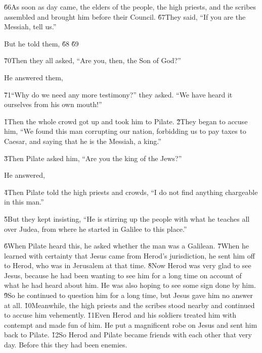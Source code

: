 \v{66}As soon as day came, the elders of the people, the high priests, and the scribes assembled and brought him before their Council. \v{67}They said, ``If you are the Messiah, tell us.''

But he told them,  \v{68} \v{69}

\v{70}Then they all asked, ``Are you, then, the Son of God?''

He answered them, 

\v{71}``Why do we need any more testimony?'' they asked. ``We have heard it ourselves from his own mouth!''

\v{1}Then the whole crowd got up and took him to Pilate. \v{2}They began to accuse him, ``We found this man corrupting our nation, forbidding us to pay taxes to Caesar, and saying that he is the Messiah, a king.''

\v{3}Then Pilate asked him, ``Are you the king of the Jews?''

He answered, 

\v{4}Then Pilate told the high priests and crowds, ``I do not find anything chargeable in this man.''

\v{5}But they kept insisting, ``He is stirring up the people with what he teaches all over Judea, from where he started in Galilee to this place.''

\v{6}When Pilate heard this, he asked whether the man was a Galilean. \v{7}When he learned with certainty that Jesus came from Herod's jurisdiction, he sent him off to Herod, who was in Jerusalem at that time. \v{8}Now Herod was very glad to see Jesus, because he had been wanting to see him for a long time on account of what he had heard about him. He was also hoping to see some sign done by him. \v{9}So he continued to question him for a long time, but Jesus gave him no answer at all. \v{10}Meanwhile, the high priests and the scribes stood nearby and continued to accuse him vehemently. \v{11}Even Herod and his soldiers treated him with contempt and made fun of him. He put a magnificent robe on Jesus and sent him back to Pilate. \v{12}So Herod and Pilate became friends with each other that very day. Before this they had been enemies.

